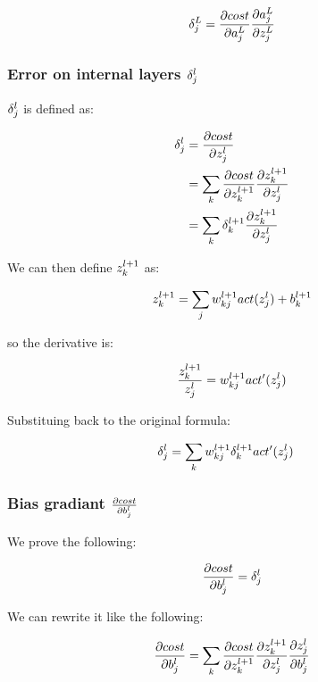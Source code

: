 \documentclass[a4paper]{article}
\begin{document}
\begin{align}
  \delta_{j}^{L} = \frac{\partial cost}{\partial a_{j}^{L}} \frac{\partial a_{j}^{L}}{\partial z_{j}^{L}}
\end{align}

\subsubsection{Error on internal layers $\delta_{j}^{l}$}

$\delta_{j}^{l}$ is defined as:

\begin{align}
  \delta_{j}^{l} &= \frac{\partial cost}{\partial z_{j}^{l}} \\
         &= \sum_{k}{\frac{\partial cost}{\partial z_{k}^{l+1}}\frac{\partial z_{k}^{l+1}}{\partial z_{j}^{l}}} \\
         &= \sum_{k}{\delta_{k}^{l+1}\frac{\partial z_{k}^{l+1}}{\partial z_{j}^{l}}}
\end{align}

We can then define $z_{k}^{l+1}$ as:

\begin{align}
  z_{k}^{l+1} = \sum_{j}{w_{kj}^{l+1}act(z_{j}^{l}) + b_{k}^{l+1}}
\end{align}

so the derivative is:

\begin{align}
  \frac{z_{k}^{l+1}}{z_{j}^{l}} = w_{kj}^{l+1}act'(z_{j}^{l})
\end{align}

Substituing back to the original formula:

\begin{align}
  \delta_{j}^{l} &= \sum_{k}{w_{kj}^{l+1} \delta_{k}^{l+1} act'(z_{j}^{l})}
\end{align}

\subsubsection{Bias gradiant $\frac{\partial cost}{\partial b_{j}^{l}}$}

We prove the following:

\begin{align}
  \frac{\partial cost}{\partial b_{j}^{l}} = \delta_{j}^{l}
\end{align}

We can rewrite it like the following:

\begin{align}
  \frac{\partial cost}{\partial b_{j}^{l}} = 
    \sum_{k}{
      \frac{\partial cost}{\partial z_{k}^{l+1}}
      \frac{\partial z_{k}^{l+1}}{\partial z_{j}^{l}}
      \frac{\partial z_{j}^{l}}{\partial b_{j}^{l}}
    }
\end{align}
\end{document}
